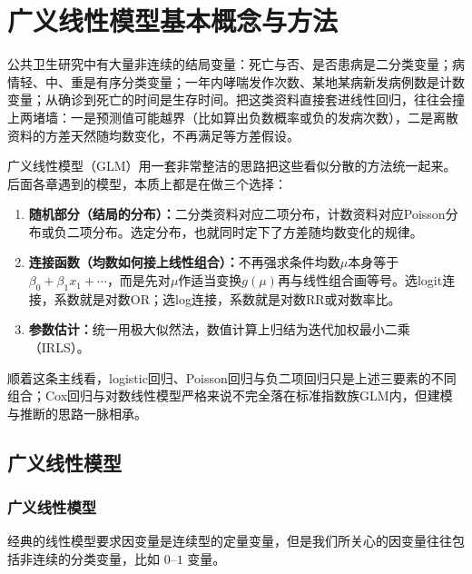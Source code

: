 \chapter{广义线性模型基本概念与方法}
公共卫生研究中有大量非连续的结局变量：死亡与否、是否患病是二分类变量；病情轻、中、重是有序分类变量；一年内哮喘发作次数、某地某病新发病例数是计数变量；从确诊到死亡的时间是生存时间。把这类资料直接套进线性回归，往往会撞上两堵墙：一是预测值可能越界（比如算出负数概率或负的发病次数），二是离散资料的方差天然随均数变化，不再满足等方差假设。

广义线性模型（GLM）用一套非常整洁的思路把这些看似分散的方法统一起来。后面各章遇到的模型，本质上都是在做三个选择：
\begin{enumerate}
\item \textbf{随机部分（结局的分布）：}二分类资料对应二项分布，计数资料对应Poisson分布或负二项分布。选定分布，也就同时定下了方差随均数变化的规律。
\item \textbf{连接函数（均数如何接上线性组合）：}不再强求条件均数$\mu$本身等于$\beta_0+\beta_1x_1+\cdots$，而是先对$\mu$作适当变换$g(\mu)$再与线性组合画等号。选logit连接，系数就是对数OR；选log连接，系数就是对数RR或对数率比。
\item \textbf{参数估计：}统一用极大似然法，数值计算上归结为迭代加权最小二乘（IRLS）。
\end{enumerate}
顺着这条主线看，logistic回归、Poisson回归与负二项回归只是上述三要素的不同组合；Cox回归与对数线性模型严格来说不完全落在标准指数族GLM内，但建模与推断的思路一脉相承。
\section{广义线性模型}
\subsection{广义线性模型}
经典的线性模型要求因变量是连续型的定量变量，但是我们所关心的因变量往往包括非连续的分类变量，比如 $0$--$1$ 变量。

